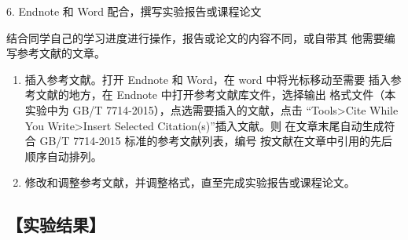 \documentclass[12pt,a4paper,UTF8]{ctexart}
\begin{document}
	6. Endnote 和 Word 配合，撰写实验报告或课程论文

	结合同学自己的学习进度进行操作，报告或论文的内容不同，或自带其
	他需要编写参考文献的文章。

	\begin{enumerate}[(1)]
		\item 插入参考文献。打开 Endnote 和 Word，在 word 中将光标移动至需要
		插入参考文献的地方，在 Endnote 中打开参考文献库文件，选择输出
		格式文件（本实验中为 GB/T 7714-2015），点选需要插入的文献，点击
		“Tools>Cite While You Write>Insert Selected Citation(s)”插入文献。则
		在文章末尾自动生成符合 GB/T 7714-2015 标准的参考文献列表，编号
		按文献在文章中引用的先后顺序自动排列。
		\item 修改和调整参考文献，并调整格式，直至完成实验报告或课程论文。
	\end{enumerate}

\subsection*{【实验结果】}
\end{document}
